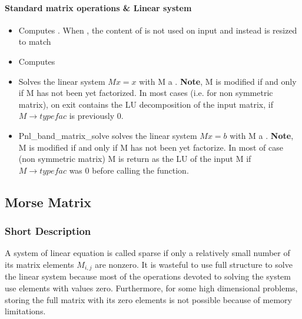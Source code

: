 \paragraph{Standard matrix operations \& Linear system}
\begin{itemize}
\item {} 
  \sshortdescribe Computes . When , the
  content of  is not used on input and instead  is resized to
  match 
\item {}
  \sshortdescribe Computes 
\item 
  \sshortdescribe Solves the linear system $M x = x$ with M a .
  {\bf Note}, M is modified if and only if M has not been yet factorized.
  In most cases (i.e. for non symmetric matrix), on exit  contains the
  LU decomposition of the input matrix, 
  if $M\rightarrow typefac$ is previously $0$.   
\item  {} 
  \sshortdescribe Pnl_band_matrix_solve solves the
  linear system $ M x = b $ with M a .
  {\bf Note}, M is modified if and only if M has not been yet factorize.
  In most of case (non symmetric matrix) M is return as the LU of the input M
  if $M\rightarrow typefac$ was $0$ before calling the function. 
\end{itemize}

\subsection{Morse Matrix}
\subsubsection{Short Description}

A system of linear equation is called sparse if only a relatively small number
of its matrix elements $M_{i, j}$ are nonzero. It is wasteful to use full
structure to solve the linear system because most of the operations devoted to
solving the system use elements with values zero. Furthermore, for some 
high dimensional problems, storing the full matrix with its zero elements is not
possible because of memory limitations.


